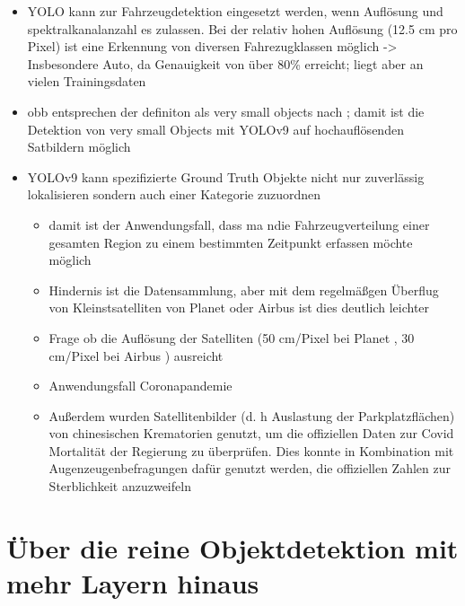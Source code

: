 \begin{itemize}
    \item YOLO kann zur Fahrzeugdetektion eingesetzt werden, wenn Auflösung und spektralkanalanzahl es zulassen. Bei der relativ hohen Auflösung (12.5  cm pro Pixel) ist eine Erkennung von diversen Fahrezugklassen möglich -> Insbesondere Auto, da Genauigkeit von über 80\% erreicht; liegt aber an vielen Trainingsdaten
    \item obb entsprechen der definiton als very small objects nach \cite{Chen2017}; damit ist die Detektion von very small Objects mit YOLOv9 auf hochauflösenden Satbildern möglich  
    \item YOLOv9 kann spezifizierte Ground Truth Objekte nicht nur zuverlässig lokalisieren sondern auch einer Kategorie zuzuordnen
    \begin{itemize}
        \item damit ist der Anwendungsfall, dass ma ndie Fahrzeugverteilung einer gesamten Region zu einem bestimmten Zeitpunkt erfassen möchte möglich
        \item Hindernis ist die Datensammlung, aber mit dem regelmäßgen Überflug von Kleinstsatelliten von Planet \cite{planet_labs} oder Airbus \cite{airbus_neo} ist dies deutlich leichter
        \item Frage ob die Auflösung der Satelliten (50 cm/Pixel bei Planet \cite{planet_labs}, 30 cm/Pixel bei Airbus \cite{airbus_neo}) ausreicht
        \item Anwendungsfall Coronapandemie
        \item Außerdem wurden Satellitenbilder (d. h Auslastung der Parkplatzflächen) von chinesischen Krematorien genutzt, um die offiziellen Daten zur Covid Mortalität der Regierung zu überprüfen. Dies konnte in Kombination mit Augenzeugenbefragungen dafür genutzt werden, die offiziellen Zahlen zur Sterblichkeit anzuzweifeln \cite{Spiegel_article}
        
    \end{itemize}
\end{itemize}

\section*{Über die reine Objektdetektion mit mehr Layern hinaus}


